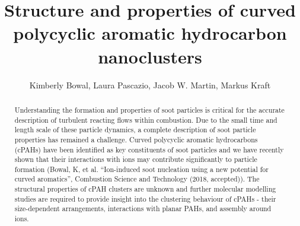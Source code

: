 \documentclass[como,a4paper,12pt,final]{Classes/c4e-preprint}
\begin{document}
\title{Structure and properties of curved polycyclic aromatic hydrocarbon nanoclusters}
\author{Kimberly Bowal, Laura Pascazio, Jacob W. Martin, Markus Kraft}
  

  




\maketitle

\begin{abstract}
Understanding the formation and properties of soot particles is critical for the accurate description of turbulent reacting flows within combustion. Due to the small time and length scale of these particle dynamics, a complete description of soot particle properties has remained a challenge. Curved polycyclic aromatic hydrocarbons (cPAHs) have been identified as key constituents of soot particles and we have recently shown that their interactions with ions may contribute significantly to particle formation (Bowal, K, et al. “Ion-induced soot nucleation using a new potential for curved aromatics”, Combustion Science and Technology (2018, accepted)). The structural properties of cPAH clusters are unknown and further molecular modelling studies are required to provide insight into the clustering behaviour of cPAHs - their size-dependent arrangements, interactions with planar PAHs, and assembly around ions.

\end{abstract}
\end{document}
